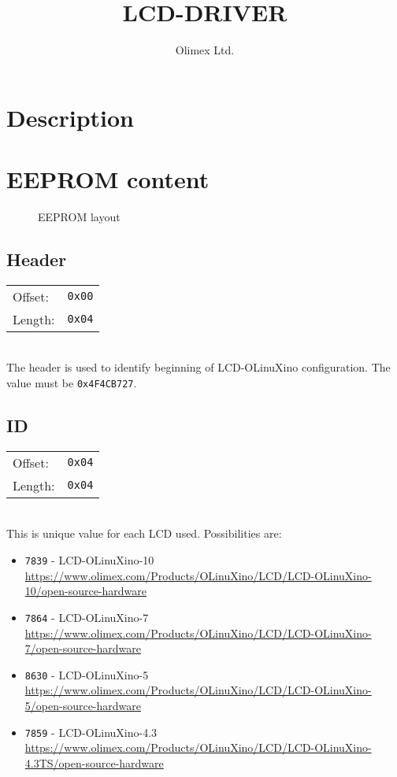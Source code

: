 \documentclass{article}
\title{LCD-DRIVER}
\author{Olimex Ltd.}
\newcommand{\regs}[2]{
	\begin{tabular}{l l}
		Offset: & \texttt{#1} \\
		Length: & \texttt{#2}
	\end{tabular} \\
	}
\begin{document}
	\maketitle
	\tableofcontents
	\listoffigures
	\pagebreak


	\section{Description}
	\begin{multicols}{2}
		\lipsum
	\end{multicols}

	\section{EEPROM content}

	\begin{figure}[H]
		\centering
		
		\caption{EEPROM layout}
		\label{fig:EEPROM_LAYOUT}
	\end{figure}

	\subsection{Header}
	\regs{0x00}{0x04}

	The header is used to identify beginning of LCD-OLinuXino configuration. The value must be
	\texttt{0x4F4CB727}.

	\subsection{ID}
	\regs{0x04}{0x04}

	This is unique value for each LCD used. Possibilities are:
	\begin{itemize}
		\item \texttt{7839} - LCD-OLinuXino-10 \\
		\url{https://www.olimex.com/Products/OLinuXino/LCD/LCD-OLinuXino-10/open-source-hardware}

		\item \texttt{7864} - LCD-OLinuXino-7 \\
		\url{https://www.olimex.com/Products/OLinuXino/LCD/LCD-OLinuXino-7/open-source-hardware}

		\item \texttt{8630} - LCD-OLinuXino-5 \\
		\url{https://www.olimex.com/Products/OLinuXino/LCD/LCD-OLinuXino-5/open-source-hardware}

		\item \texttt{7859} - LCD-OLinuXino-4.3 \\
		\url{https://www.olimex.com/Products/OLinuXino/LCD/LCD-OLinuXino-4.3TS/open-source-hardware}
	\end{itemize}
\end{document}
